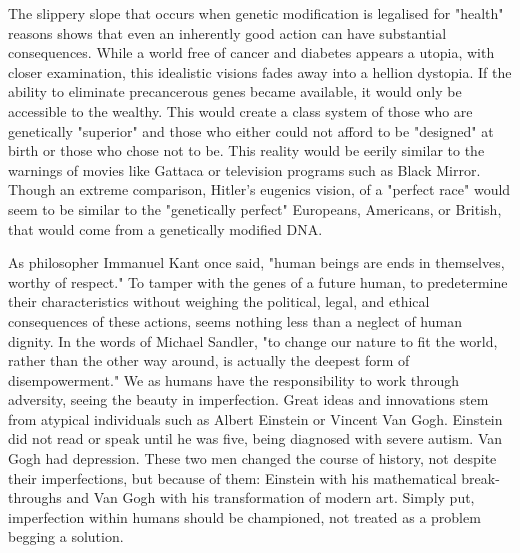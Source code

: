    The slippery slope that occurs when genetic modification is legalised
   for "health" reasons shows that even an inherently good action can have
   substantial consequences. While a world free of cancer and diabetes
   appears a utopia, with closer examination, this idealistic visions
   fades away into a hellion dystopia. If the ability to eliminate
   precancerous genes became available, it would only be accessible to the
   wealthy. This would create a class system of those who are genetically
   "superior" and those who either could not afford to be "designed" at
   birth or those who chose not to be. This reality would be eerily
   similar to the warnings of movies like Gattaca or television programs
   such as Black Mirror. Though an extreme comparison, Hitler's eugenics
   vision, of a "perfect race" would seem to be similar to the
   "genetically perfect" Europeans, Americans, or British, that would come
   from a genetically modified DNA.

   As philosopher Immanuel Kant once said, "human beings are ends in
   themselves, worthy of respect."  To tamper with the genes of a future
   human, to predetermine their characteristics without weighing the
   political, legal, and ethical consequences of these actions, seems
   nothing less than a neglect of human dignity.  In the words of Michael
   Sandler, "to change our nature to fit the world, rather than the other
   way around, is actually the deepest form of disempowerment." We as
   humans have the responsibility to work through adversity, seeing the
   beauty in imperfection. Great ideas and innovations stem from atypical
   individuals such as Albert Einstein or Vincent Van Gogh. Einstein did
   not read or speak until he was five, being diagnosed with severe
   autism. Van Gogh had depression. These two men changed the course of
   history, not despite their imperfections, but because of them: Einstein
   with his mathematical break-throughs and Van Gogh with his
   transformation of modern art. Simply put, imperfection within humans
   should be championed, not treated as a problem begging a solution.
